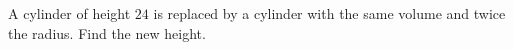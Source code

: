 A cylinder of height $ 24 $ is replaced by a cylinder with the same volume and twice the radius. Find the new height.
